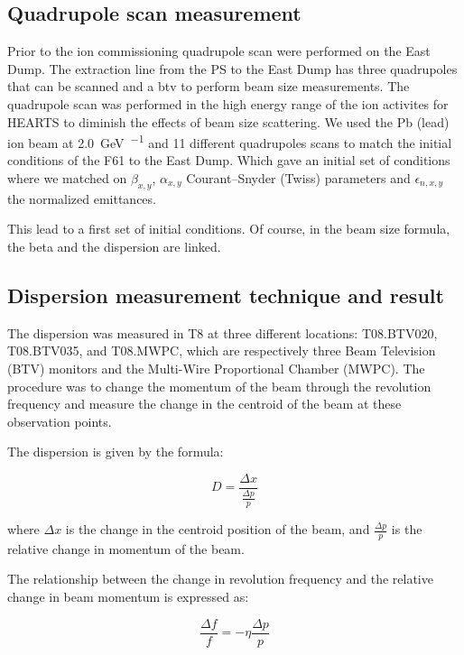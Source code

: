 \documentclass[a4paper,
               ]{jacow}
\begin{document}
\subsection{Quadrupole scan measurement}

Prior to the ion commissioning quadrupole scan were performed on the East Dump. The extraction line from the PS to the East Dump has three quadrupoles that can be scanned and a btv to perform beam size measurements. The quadrupole scan was performed in the high energy range of the ion activites for HEARTS to diminish the effects of beam size scattering. We used the Pb (lead) ion beam at \SI{2.0}{\giga\electronvolt\per\nucleon} and 11 different quadrupoles scans to match the initial conditions of the F61 to the East Dump. Which gave an initial set of conditions where we matched on $\beta_{x,y}$, $\alpha_{x,y}$ Courant–Snyder (Twiss) parameters and $\epsilon_{n,x,y}$ the normalized emittances.

This lead to a first set of initial conditions. Of course, in the beam size formula, the beta and the dispersion are linked.



\subsection{Dispersion measurement technique and result}


The dispersion was measured in T8 at three different locations: T08.BTV020, T08.BTV035, and T08.MWPC, which are respectively three Beam Television (BTV) monitors and the Multi-Wire Proportional Chamber (MWPC). The procedure was to change the momentum of the beam through the revolution frequency and measure the change in the centroid of the beam at these observation points.

The dispersion is given by the formula:

\begin{equation}
D = \frac{\Delta x}{\frac{\Delta p}{p}}
\end{equation}

where $\Delta x$ is the change in the centroid position of the beam, and $\frac{\Delta p}{p}$ is the relative change in momentum of the beam.

The relationship between the change in revolution frequency and the relative change in beam momentum is expressed as:

\begin{equation}
\frac{\Delta f}{f} = -\eta \frac{\Delta p}{p}
\end{equation}
\end{document}
